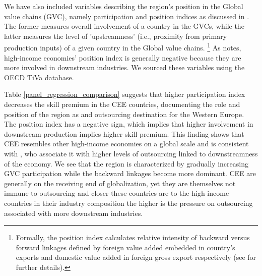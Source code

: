 \documentclass[11pt]{article}
\begin{document}
We have also included variables describing the region's position in the Global value chains (GVC), namely participation and position indices as discussed in \citet{coveri2024global}. The former measures overall involvement of a country in the GVCs, while the latter measures the level of 'upstreamness' (i.e., proximity from primary production inputs) of a given country in the Global value chains. \footnote{Formally, the position index calculates relative intensity of backward versus forward linkages defined by foreign value added embedded in country's exports and domestic value added in foreign gross export respectively (see \cite{coveri2024global} for further details).} As \cite{coveri2024global} notes, high-income economies' position index is generally negative because they are more involved in downstream industries. We sourced these variables using the OECD TiVa database.

Table \ref{panel_regression_comparison} suggests that higher participation index decreases the skill premium in the CEE countries, documenting the role and position of the region as and outsourcing destination for the Western Europe. The position index has a negative sign, which implies that higher involvement in downstream production implies higher skill premium. This finding shows that CEE resembles other high-income economies on a global scale and is consistent with \citet{coveri2024global}, who associate it with higher levels of outsourcing linked to downstreamness of the economy. We see that the region is characterized by gradually increasing GVC participation while the backward linkages become more dominant. CEE are generally on the receiving end of globalization, yet they are themselves not immune to outsourcing and closer these countries are to the high-income countries in their industry composition the higher is the pressure on outsourcing associated with more downstream industries.
\end{document}
